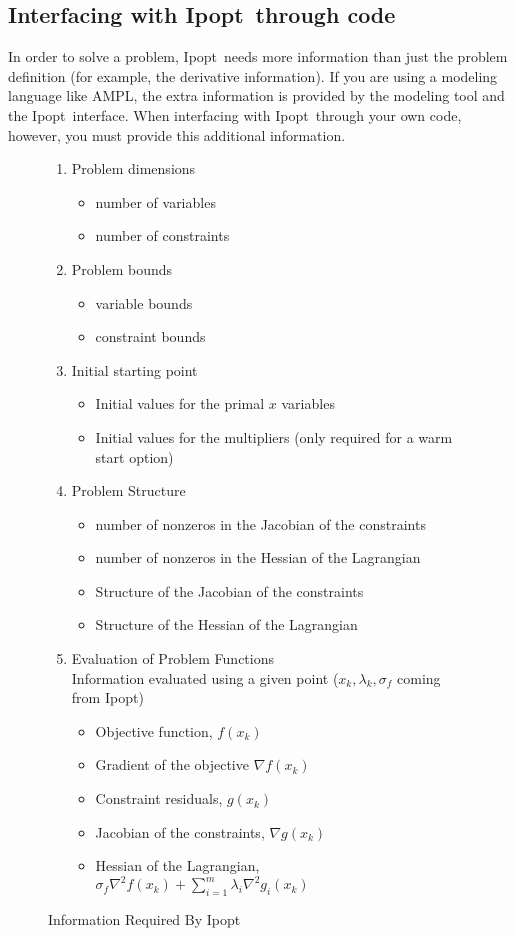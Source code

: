 \documentclass[letter,10pt]{article}
\newcommand{\Ipopt}{{\sc Ipopt}}
\begin{document}
\subsection{Interfacing with \Ipopt\ through code}
In order to solve a problem, \Ipopt\ needs more information than just
the problem definition (for example, the derivative information). If
you are using a modeling language like AMPL, the extra information is
provided by the modeling tool and the \Ipopt\ interface. When
interfacing with \Ipopt\ through your own code, however, you must
provide this additional information.

\begin{figure}
\begin{enumerate}
\item Problem dimensions \label{it.prob_dim}
  \begin{itemize}
  \item number of variables
  \item number of constraints
  \end{itemize}
\item Problem bounds
  \begin{itemize}
  \item variable bounds
  \item constraint bounds
  \end{itemize}
\item Initial starting point
  \begin{itemize}
  \item Initial values for the primal $x$ variables
  \item Initial values for the multipliers (only
    required for a warm start option)
  \end{itemize}
\item Problem Structure \label{it.prob_struct}
  \begin{itemize}
  \item number of nonzeros in the Jacobian of the constraints
  \item number of nonzeros in the Hessian of the Lagrangian
  \item Structure of the Jacobian of the constraints
  \item Structure of the Hessian of the Lagrangian
  \end{itemize}
\item Evaluation of Problem Functions \label{it.prob_eval} \\
  Information evaluated using a given point ($x_k,
  \lambda_k, \sigma_f$ coming from \Ipopt)
  \begin{itemize}
  \item Objective function, $f(x_k)$
  \item Gradient of the objective $\nabla f(x_k)$
  \item Constraint residuals, $g(x_k)$
  \item Jacobian of the constraints, $\nabla g(x_k)$
  \item Hessian of the Lagrangian, 
    $\sigma_f \nabla^2 f(x_k) + \sum_{i=1}^m\lambda_i\nabla^2 g_i(x_k)$ 
  \end{itemize}
\end{enumerate}
\caption{Information Required By \Ipopt}
\label{fig.required_info}
\end{figure}
\end{document}
